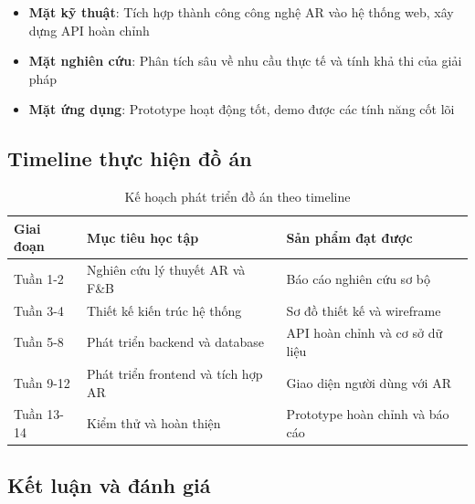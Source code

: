 \documentclass[12pt,a4paper]{article}
\begin{document}
\begin{tcolorbox}[colback=green!5!white,colframe=darkgreen,title=\textbf{Kết quả nghiên cứu chính}]
\begin{itemize}[leftmargin=1cm]
    \item \textbf{Mặt kỹ thuật}: Tích hợp thành công công nghệ AR vào hệ thống web, xây dựng API hoàn chỉnh
    \item \textbf{Mặt nghiên cứu}: Phân tích sâu về nhu cầu thực tế và tính khả thi của giải pháp
    \item \textbf{Mặt ứng dụng}: Prototype hoạt động tốt, demo được các tính năng cốt lõi
\end{itemize}
\end{tcolorbox}

\subsection{Timeline thực hiện đồ án}

\begin{table}[H]
\centering
\caption{Kế hoạch phát triển đồ án theo timeline}
\label{tab:project-timeline}
\begin{tabular}{@{}>{\raggedright\arraybackslash}p{2cm}>{\raggedright\arraybackslash}p{5cm}>{\raggedright\arraybackslash}p{5cm}@{}}
\toprule
\textbf{Giai đoạn} & \textbf{Mục tiêu học tập} & \textbf{Sản phẩm đạt được} \\
\midrule
Tuần 1-2 & Nghiên cứu lý thuyết AR và F\&B & Báo cáo nghiên cứu sơ bộ \\
Tuần 3-4 & Thiết kế kiến trúc hệ thống & Sơ đồ thiết kế và wireframe \\
Tuần 5-8 & Phát triển backend và database & API hoàn chỉnh và cơ sở dữ liệu \\
Tuần 9-12 & Phát triển frontend và tích hợp AR & Giao diện người dùng với AR \\
Tuần 13-14 & Kiểm thử và hoàn thiện & Prototype hoàn chỉnh và báo cáo \\
\bottomrule
\end{tabular}
\end{table}

\subsection{Kết luận và đánh giá}
\end{document}
